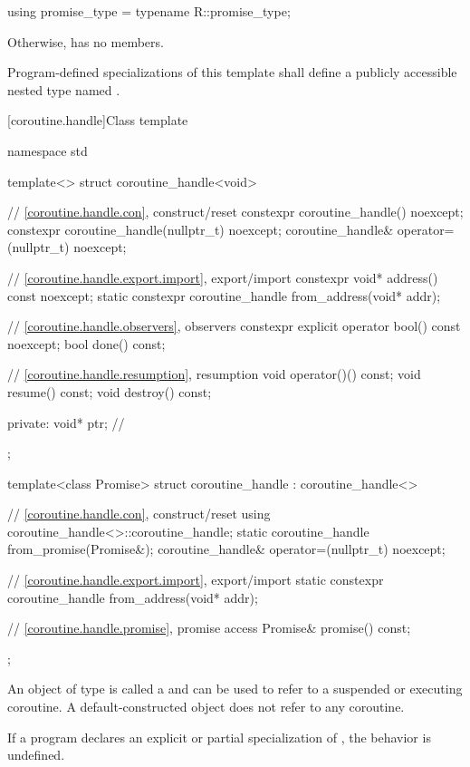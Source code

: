 \begin{codeblock}
  using promise_type = typename R::promise_type;
\end{codeblock}

Otherwise,  has no members.

\pnum
Program-defined specializations of this template shall define a publicly
accessible nested type named .

[coroutine.handle]{Class template }

%
\begin{codeblock}
namespace std {
  template<>
  struct coroutine_handle<void>
  {
    // \ref{coroutine.handle.con}, construct/reset
    constexpr coroutine_handle() noexcept;
    constexpr coroutine_handle(nullptr_t) noexcept;
    coroutine_handle& operator=(nullptr_t) noexcept;

    // \ref{coroutine.handle.export.import}, export/import
    constexpr void* address() const noexcept;
    static constexpr coroutine_handle from_address(void* addr);

    // \ref{coroutine.handle.observers}, observers
    constexpr explicit operator bool() const noexcept;
    bool done() const;

    // \ref{coroutine.handle.resumption}, resumption
    void operator()() const;
    void resume() const;
    void destroy() const;

  private:
    void* ptr;  // \expos
  };

  template<class Promise>
  struct coroutine_handle : coroutine_handle<>
  {
    // \ref{coroutine.handle.con}, construct/reset
    using coroutine_handle<>::coroutine_handle;
    static coroutine_handle from_promise(Promise&);
    coroutine_handle& operator=(nullptr_t) noexcept;

    // \ref{coroutine.handle.export.import}, export/import
    static constexpr coroutine_handle from_address(void* addr);

    // \ref{coroutine.handle.promise}, promise access
    Promise& promise() const;
  };
}
\end{codeblock}

\pnum
An object of type
 is called a 
and can be used to refer to a suspended or executing coroutine.
A default-constructed  object does not refer to any
coroutine.

\pnum
If a program declares an explicit or partial specialization of
, the behavior is undefined.

